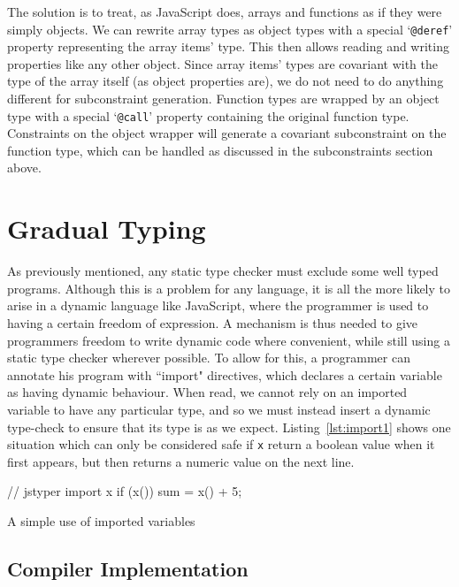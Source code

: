 \documentclass[12pt,a4paper,twoside,openright]{report}
\theoremstyle{definition}
\theoremstyle{dotless}
\newcommand*{\js}{\texttt}
\begin{document}
The solution is to treat, as JavaScript does, arrays and functions as if they
were simply objects. We can rewrite array types as object types with a special
`\texttt{@deref}' property representing the array items' type. This then allows
reading and writing properties like any other object. Since array items' types
are covariant with the type of the array itself (as object properties are), we
do not need to do anything different for subconstraint generation. Function
types are wrapped by an object type with a special `\texttt{@call}' property
containing the original function type. Constraints on the object wrapper will
generate a covariant subconstraint on the function type, which can be handled
as discussed in the subconstraints section above.

\section{Gradual Typing}

As previously mentioned, any static type checker must exclude some well typed
programs.  Although this is a problem for any language, it is all the more
likely to arise in a dynamic language like JavaScript, where the programmer is
used to having a certain freedom of expression. A mechanism is thus needed to
give programmers freedom to write dynamic code where convenient, while still
using a static type checker wherever possible. To allow for this, a programmer
can annotate his program with ``import" directives, which declares a certain
variable as having dynamic behaviour. When read, we cannot rely on an imported
variable to have any particular type, and so we must instead insert a dynamic
type-check to ensure that its type is as we expect.
Listing~\ref{lst:import1} shows one situation which can only be considered safe if
\js{x} return a boolean value when it first appears, but then returns a numeric value on
the next line. 
\begin{listing}
  \begin{jscript}
	// jstyper import x
	if (x()) {
	  sum = x() + 5;
	}
  \end{jscript}
  \caption{A simple use of imported variables}\label{lst:import1}
\end{listing}

\subsection{Compiler Implementation}
\end{document}
